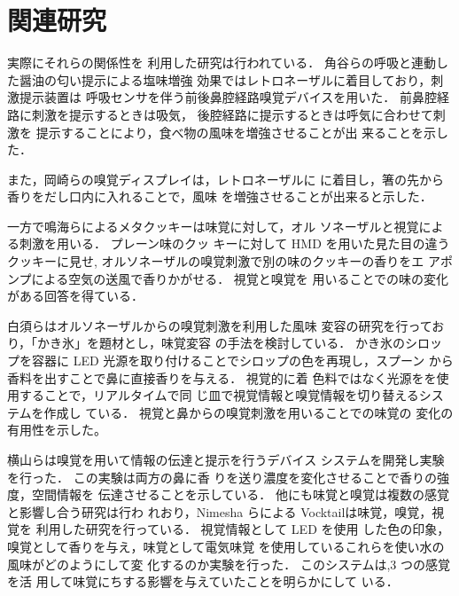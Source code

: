 \section{関連研究}

実際にそれらの関係性を
利用した研究は行われている．
角谷らの呼吸と連動した醤油の匂い提示による塩味増強
効果\cite{enmi}ではレトロネーザルに着目しており，刺激提示装置は
呼吸センサを伴う前後鼻腔経路嗅覚デバイスを用いた． 
前鼻腔経路に刺激を提示するときは吸気，
後腔経路に提示するときは呼気に合わせて刺激を
提示することにより，食べ物の風味を増強させることが出
来ることを示した．


また，岡崎らの嗅覚ディスプレイは，レトロネーザルに
に着目し，箸の先から香りをだし口内に入れることで，風味
を増強させることが出来ると示した．\cite{hasi}


一方で鳴海らによるメタクッキー\cite{narumi2}は味覚に対して，オル
ソネーザルと視覚による刺激を用いる． プレーン味のクッ
キーに対して HMD を用いた見た目の違うクッキーに見せ,
オルソネーザルの嗅覚刺激で別の味のクッキーの香りをエ
アポンプによる空気の送風で香りかがせる． 視覚と嗅覚を
用いることでの味の変化がある回答を得ている．


白須らはオルソネーザルからの嗅覚刺激を利用した風味
変容の研究を行っており，「かき氷」を題材とし，味覚変容
の手法を検討している． かき氷のシロップを容器に LED
光源を取り付けることでシロップの色を再現し，スプーン
から香料を出すことで鼻に直接香りを与える． 視覚的に着
色料ではなく光源をを使用することで，リアルタイムで同
じ皿で視覚情報と嗅覚情報を切り替えるシステムを作成し
ている． 視覚と鼻からの嗅覚刺激を用いることでの味覚の
変化の有用性を示した。\cite{fan}\cite{pomp}


横山らは嗅覚を用いて情報の伝達と提示を行うデバイス
システム\cite{hirose}を開発し実験を行った． この実験は両方の鼻に香
りを送り濃度を変化させることで香りの強度，空間情報を
伝達させることを示している．
他にも味覚と嗅覚は複数の感覚と影響し合う研究は行わ
れおり，Nimesha らによる Vocktail\cite{vock}は味覚，嗅覚，視覚を
利用した研究を行っている． 視覚情報として LED を使用
した色の印象，嗅覚として香りを与え，味覚として電気味覚
を使用しているこれらを使い水の風味がどのようにして変
化するのか実験を行った． このシステムは,3 つの感覚を活
用して味覚にちする影響を与えていたことを明らかにして
いる．

